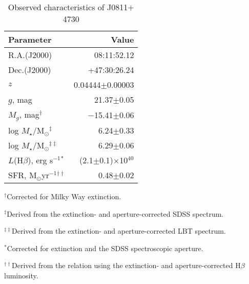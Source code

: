 \begin{table}
\caption{Observed characteristics of J0811$+$4730 \label{tab1}}
\begin{tabular}{lr} \hline
Parameter                 &  Value       \\ \hline
R.A.(J2000)               &  08:11:52.12 \\
Dec.(J2000)               & +47:30:26.24 \\
  $z$                     &  0.04444$\pm$0.00003     \\
  $g$, mag                &   21.37$\pm$0.05      \\
  $M_g$, mag$^\dag$        & $-$15.41$\pm$0.06     \\
log $M_\star$/M$_\odot$$^\ddag$&   6.24$\pm$0.33       \\
log $M_\star$/M$_\odot$$^{\ddag\ddag}$&   6.29$\pm$0.06       \\
$L$(H$\beta$), erg s$^{-1}$$^*$&(2.1$\pm$0.1)$\times$10$^{40}$\\
SFR, M$_\odot$yr$^{-1}$$^{\dag\dag}$  &     0.48$\pm$0.02 \\
\hline
  \end{tabular}

\noindent$^\dag$Corrected for Milky Way extinction.

\noindent$^\ddag$Derived from the extinction- and aperture-corrected SDSS 
spectrum.

\noindent$^{\ddag\ddag}$Derived from the extinction- and aperture-corrected LBT 
spectrum.

\noindent$^*$Corrected for extinction and the SDSS spectroscopic aperture.

\noindent$^{\dag\dag}$Derived from the \citet{K98} relation using the extinction- 
and aperture-corrected H$\beta$ luminosity.
  \end{table}
